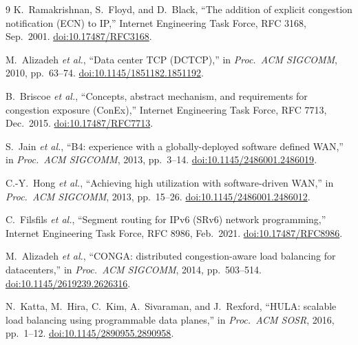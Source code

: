 \documentclass[11pt]{article}
\begin{document}
\begin{thebibliography}{9}
K.~Ramakrishnan, S.~Floyd, and D.~Black, ``The addition of explicit
congestion notification (ECN) to IP,'' Internet Engineering Task Force, RFC 3168, Sep.~2001. \href{https://doi.org/10.17487/RFC3168}{doi:10.17487/RFC3168}.

M.~Alizadeh \emph{et al.}, ``Data center TCP (DCTCP),'' in
\emph{Proc.\ ACM SIGCOMM}, 2010, pp.~63--74. \href{https://doi.org/10.1145/1851182.1851192}{doi:10.1145/1851182.1851192}.

B.~Briscoe \emph{et al.}, ``Concepts, abstract mechanism, and
requirements for congestion exposure (ConEx),'' Internet Engineering Task Force, RFC 7713, Dec.~2015. \href{https://doi.org/10.17487/RFC7713}{doi:10.17487/RFC7713}.

S.~Jain \emph{et al.}, ``B4: experience with a globally-deployed
software defined WAN,'' in \emph{Proc.\ ACM SIGCOMM}, 2013, pp.~3--14. \href{https://doi.org/10.1145/2486001.2486019}{doi:10.1145/2486001.2486019}.

C.-Y.~Hong \emph{et al.}, ``Achieving high utilization with
software-driven WAN,'' in \emph{Proc.\ ACM SIGCOMM}, 2013, pp.~15--26. \href{https://doi.org/10.1145/2486001.2486012}{doi:10.1145/2486001.2486012}.

C.~Filsfils \emph{et al.}, ``Segment routing for IPv6 (SRv6) network
programming,'' Internet Engineering Task Force, RFC 8986, Feb.~2021. \href{https://doi.org/10.17487/RFC8986}{doi:10.17487/RFC8986}.

M.~Alizadeh \emph{et al.}, ``CONGA: distributed congestion-aware load
balancing for datacenters,'' in \emph{Proc.\ ACM SIGCOMM}, 2014, pp.~503--514. \href{https://doi.org/10.1145/2619239.2626316}{doi:10.1145/2619239.2626316}.

N.~Katta, M.~Hira, C.~Kim, A.~Sivaraman, and J.~Rexford, ``HULA:
scalable load balancing using programmable data planes,'' in
\emph{Proc.\ ACM SOSR}, 2016, pp.~1--12. \href{https://doi.org/10.1145/2890955.2890958}{doi:10.1145/2890955.2890958}.
\end{thebibliography}
\end{document}
